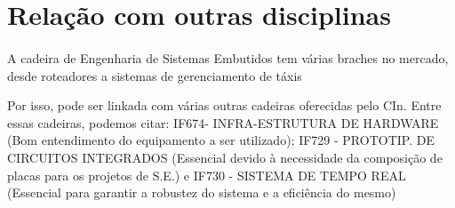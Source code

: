 \documentclass[article]{abntex2}
\begin{document}
\section{Relação com outras disciplinas}

\paragraph{}
A cadeira de Engenharia de Sistemas Embutidos tem várias braches no mercado, desde roteadores a sistemas de gerenciamento de táxis \cite{sistemaTaxis}

Por isso, pode ser linkada com várias outras cadeiras oferecidas pelo CIn. Entre essas cadeiras, podemos citar: IF674- INFRA-ESTRUTURA DE HARDWARE (Bom entendimento do equipamento a ser utilizado); IF729 - PROTOTIP. DE CIRCUITOS INTEGRADOS (Essencial devido à necessidade da composição de placas para os projetos de S.E.) e IF730 - SISTEMA DE TEMPO REAL (Essencial para garantir a robustez do sistema e a eficiência do mesmo)



\end{document}
